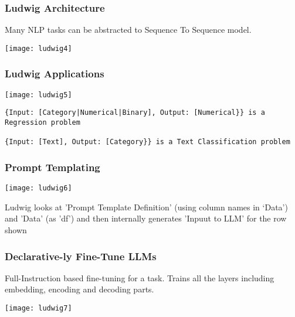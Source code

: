 \begin{frame}[fragile]\frametitle{Ludwig Architecture}

Many NLP tasks can be abstracted to Sequence To Sequence model.

		\begin{center}
		\texttt{[image: ludwig4]}
		\end{center}

\end{frame}


\begin{frame}[fragile]\frametitle{Ludwig Applications}

		\begin{center}
		\texttt{[image: ludwig5]}
		\end{center}

\begin{lstlisting}
{Input: [Category|Numerical|Binary], Output: [Numerical}} is a Regression problem 

{Input: [Text], Output: [Category}} is a Text Classification problem
\end{lstlisting}

\end{frame}

\begin{frame}[fragile]\frametitle{Prompt Templating}

		\begin{center}
		\texttt{[image: ludwig6]}
		\end{center}
		
Ludwig looks at 'Prompt Template Definition' (using column names in `Data') and 'Data' (as 'df') and then internally generates 'Inpuut to LLM' for the row shown

\end{frame}

\begin{frame}[fragile]\frametitle{Declarative-ly Fine-Tune LLMs}

Full-Instruction based fine-tuning for a task. Trains all the layers including embedding, encoding and decoding parts.

		\begin{center}
		\texttt{[image: ludwig7]}
		\end{center}

\end{frame}

